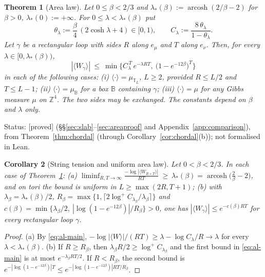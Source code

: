 \documentclass[11pt,a4paper]{article}
\theoremstyle{remark}
\theoremstyle{definition}
\theoremstyle{plain}
\newtheorem{althm}{Theorem}[section]
\newtheorem{alcor}[althm]{Corollary}
\theoremstyle{remark}
\DeclareMathOperator{\arcosh}{arcosh}
\newcommand{\Z}{\mathbb{Z}}
\newcommand{\st}[1]{\textsf{[#1]}}
\begin{document}
\begin{althm}[Area law]\label{thm:area}
Let $0\le\beta<2/3$ and $\lambda_*(\beta):=\arcosh(2/\beta-2)$ for $\beta>0$, $\lambda_*(0):=+\infty$. For $0\le\lambda<\lambda_*(\beta)$ put
\begin{equation}\label{eq:al-theta}
\theta_\lambda:=\frac\beta4\,(2\cosh\lambda+4)\in[0,1),\qquad C_\lambda:=\frac{8\,\theta_\lambda}{1-\theta_\lambda}.
\end{equation}
Let $\gamma$ be a rectangular loop with sides $R$ along $e_\mu$ and $T$ along $e_\nu$. Then, for every $\lambda\in[0,\lambda_*(\beta))$,
\begin{equation}\label{eq:al-main}
|\langle W_\gamma\rangle|\ \le\ \min\Big\{C_\lambda^{\,T}\,e^{-\lambda RT},\ \big(1-e^{-12\beta}\big)^{T}\Big\}
\end{equation}
in each of the following cases: \emph{(i)} $\langle\cdot\rangle=\mu_{\mathbb T_L}$, $L\ge2$, provided $R\le L/2$ and $T\le L-1$; \emph{(ii)} $\langle\cdot\rangle=\mu_{\mathbb B}$ for a box $\mathbb B$ containing $\gamma$; \emph{(iii)} $\langle\cdot\rangle=\mu$ for any Gibbs measure $\mu$ on $\Z^4$. The two sides may be exchanged. The constants depend on $\beta$ and $\lambda$ only.
\end{althm}
\noindent Status: \st{proved} (\S\S\ref{sec:slab}--\ref{sec:areaproof} and Appendix~\ref{app:comparison}), from Theorem~\ref{thm:chordal} (through Corollary~\ref{cor:chordal}(b)); not formalised in Lean.

\begin{alcor}[String tension and uniform area law]\label{cor:area}
Let $0<\beta<2/3$. In each case of Theorem~\ref{thm:area}:
\emph{(a)} $\displaystyle\liminf_{R,T\to\infty}\frac{-\log|\langle W_{R\times T}\rangle|}{RT}\ \ge\ \lambda_*(\beta)=\arcosh\Big(\frac2\beta-2\Big)$, and on tori the bound is uniform in $L\ge\max(2R,T+1)$;
\emph{(b)} with $\lambda_\beta=\lambda_*(\beta)/2$, $R_\beta=\max\{1,\lceil2\log^+C_{\lambda_\beta}/\lambda_\beta\rceil\}$ and $c(\beta)=\min\{\lambda_\beta/2,\ |\log(1-e^{-12\beta})|/R_\beta\}>0$, one has $|\langle W_\gamma\rangle|\le e^{-c(\beta)RT}$ for every rectangular loop $\gamma$.
\end{alcor}
\begin{proof}
(a) By \eqref{eq:al-main}, $-\log|\langle W\rangle|/(RT)\ge\lambda-\log C_\lambda/R\to\lambda$ for every $\lambda<\lambda_*(\beta)$.
(b) If $R\ge R_\beta$, then $\lambda_\beta R/2\ge\log^+C_{\lambda_\beta}$ and the first bound in \eqref{eq:al-main} is at most $e^{-\lambda_\beta RT/2}$. If $R<R_\beta$, the second bound is $e^{-|\log(1-e^{-12\beta})|T}\le e^{-|\log(1-e^{-12\beta})|RT/R_\beta}$.
\end{proof}
\end{document}
